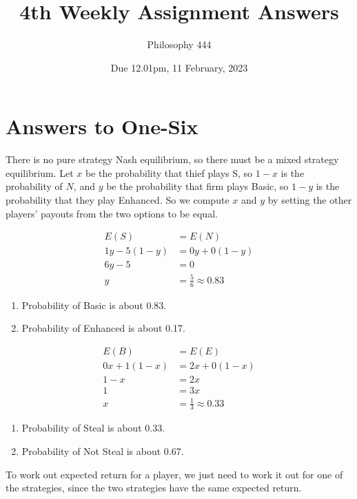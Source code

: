 \documentclass[
  10pt,
]{article}
\title{4th Weekly Assignment Answers}
\author{Philosophy 444}
\date{Due 12.01pm, 11 February, 2023}
\providecommand{\tightlist}{%
  \setlength{\itemsep}{0pt}\setlength{\parskip}{0pt}}
\begin{document}
\maketitle

\hypertarget{answers-to-one-six}{%
\section{Answers to One-Six}\label{answers-to-one-six}}

There is no pure strategy Nash equilibrium, so there must be a mixed
strategy equilibrium. Let \(x\) be the probability that thief plays S,
so \(1-x\) is the probability of \(N\), and \(y\) be the probability
that firm plays Basic, so \(1-y\) is the probability that they play
Enhanced. So we compute \(x\) and \(y\) by setting the other players'
payouts from the two options to be equal.

\begin{align*}
E(S) &= E(N) \\
1y - 5(1-y) &= 0y + 0(1-y) \\
6y - 5 &= 0 \\
y &= \frac{5}{6} \approx 0.83
\end{align*}

\begin{enumerate}
\def\labelenumi{\arabic{enumi}.}
\tightlist
\item
  Probability of Basic is about 0.83.
\item
  Probability of Enhanced is about 0.17.
\end{enumerate}

\begin{align*}
E(B) &= E(E) \\
0x + 1(1-x) &= 2x + 0(1-x) \\
1-x &= 2x \\
1 &= 3x \\
x &= \frac{1}{3} \approx 0.33
\end{align*}

\begin{enumerate}
\def\labelenumi{\arabic{enumi}.}
\setcounter{enumi}{2}
\tightlist
\item
  Probability of Steal is about 0.33.
\item
  Probability of Not Steal is about 0.67.
\end{enumerate}

To work out expected return for a player, we just need to work it out
for one of the strategies, since the two strategies have the same
expected return.
\end{document}
